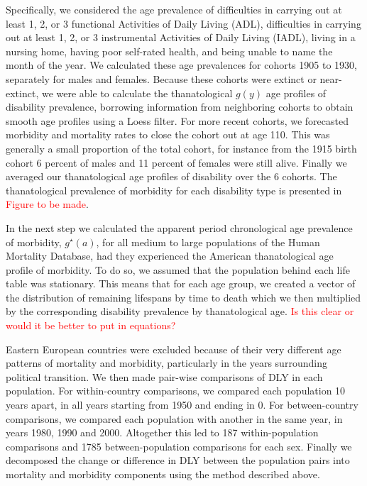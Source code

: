 \documentclass[11pt,oneside,a4paper]{article} %
\begin{document}
Specifically, we considered the age prevalence of difficulties in carrying out at least 1, 2, or 3 functional Activities of Daily Living (ADL), difficulties in carrying out at least 1, 2, or 3 instrumental Activities of Daily Living (IADL), living in a nursing home, having poor self-rated health, and being unable to name the month of the year. We calculated these age prevalences for cohorts 1905 to 1930, separately for males and females. Because these cohorts were extinct or near-extinct, we were able to calculate the thanatological $g(y)$ age profiles of disability prevalence, borrowing information from neighboring cohorts to obtain smooth age profiles using a Loess filter. For more recent cohorts, we forecasted morbidity and mortality rates to close the cohort out at age 110. This was generally a small proportion of the total cohort, for instance from the 1915 birth cohort 6 percent of males and 11 percent of females were still alive. Finally we averaged our thanatological age profiles of disability over the 6 cohorts. The thanatological prevalence of morbidity for each disability type is presented in \textcolor{red}{Figure to be made}.

In the next step we calculated the apparent period chronological age prevalence of morbidity, $g^\star(a)$, for all medium to large populations of the Human Mortality Database, had they experienced the American thanatological age profile of morbidity. To do so, we assumed that the population behind each life table was stationary. This means that for each age group, we created a vector of the distribution of remaining lifespans by time to death which we then multiplied by the corresponding disability prevalence by thanatological age. \textcolor{red}{Is this clear or would it be better to put in equations?}

Eastern European countries were excluded because of their very different age patterns of mortality and morbidity, particularly in the years surrounding political transition. We then made pair-wise comparisons of DLY in each population. For within-country comparisons, we compared each population 10 years apart, in all years starting from 1950 and ending in 0. For between-country comparisons, we compared each population with another in the same year, in years 1980, 1990 and 2000. Altogether this led to 187 within-population comparisons and 1785 between-population comparisons for each sex. Finally we decomposed the change or difference in DLY between the population pairs into mortality and morbidity components using the \citet{Nusselder2004} method described above.
\end{document}
